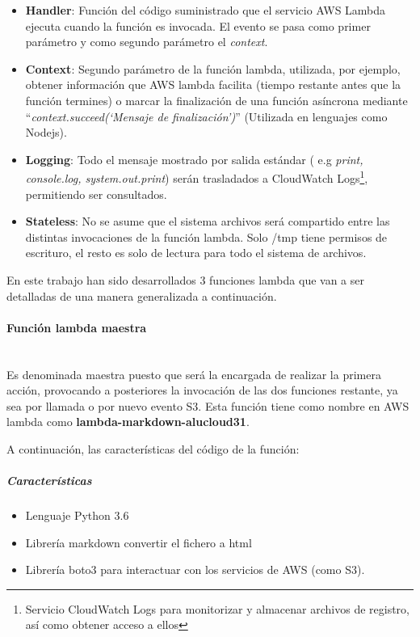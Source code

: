 \documentclass[
]{article}
\begin{document}
\begin{itemize}
\item
  \textbf{Handler}: Función del código suministrado que el servicio AWS
  Lambda ejecuta cuando la función es invocada. El evento se pasa como
  primer parámetro y como segundo parámetro el \emph{context}.
\item
  \textbf{Context}: Segundo parámetro de la función lambda, utilizada,
  por ejemplo, obtener información que AWS lambda facilita (tiempo
  restante antes que la función termines) o marcar la finalización de
  una función asíncrona mediante ``\emph{context.succeed(`Mensaje de
  finalización')}'' (Utilizada en lenguajes como Nodejs).
\item
  \textbf{Logging}: Todo el mensaje mostrado por salida estándar ( e.g
  \emph{print, console.log, system.out.print}) serán trasladados a
  CloudWatch Logs\footnote{Servicio CloudWatch Logs para monitorizar y
    almacenar archivos de registro, así como obtener acceso a ellos},
  permitiendo ser consultados.
\item
  \textbf{Stateless}: No se asume que el sistema archivos será
  compartido entre las distintas invocaciones de la función lambda. Solo
  /tmp tiene permisos de escrituro, el resto es solo de lectura para
  todo el sistema de archivos.
\end{itemize}

En este trabajo han sido desarrollados 3 funciones lambda que van a ser
detalladas de una manera generalizada a continuación.

\hypertarget{header-n39}{%
\paragraph{Función lambda maestra}\label{header-n39}}
\leavevmode
\newline
\\
Es denominada maestra puesto que será la encargada de realizar la
primera acción, provocando a posteriores la invocación de las dos
funciones restante, ya sea por llamada o por nuevo evento S3. Esta
función tiene como nombre en AWS lambda como
\textbf{lambda-markdown-alucloud31}.

A continuación, las características del código de la función:

\hypertarget{header-n42}{%
\subparagraph{Características}\label{header-n42}}

\begin{itemize}
\item
  Lenguaje Python 3.6
\item
  Librería markdown convertir el fichero a html
\item
  Librería boto3 para interactuar con los servicios de AWS (como S3).
\end{itemize}
\end{document}
